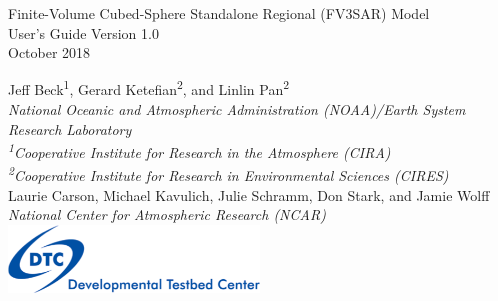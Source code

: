 \begin{titlepage}
{}
\noindent
   \begin{center}     

        \Huge{Finite-Volume Cubed-Sphere Standalone Regional (FV3SAR) Model}\\[1em]       
     {\color{darkcerulean}
        \Huge{User's Guide Version 1.0 }\\[1em]       
        \normalsize{October 2018}\\[5em] 
       }
 
      \normalsize{Jeff Beck\textsuperscript{1}, Gerard Ketefian\textsuperscript{2}, and Linlin Pan\textsuperscript{2}}\\ 
      \textit{\small{National Oceanic and Atmospheric Administration (NOAA)/Earth System Research Laboratory}}\\
      \textit{\small{\textsuperscript{1}Cooperative Institute for Research in the Atmosphere (CIRA)}}\\
      \textit{\small{\textsuperscript{2}Cooperative Institute for Research in Environmental Sciences (CIRES)}}\\[2em]
      \normalsize{Laurie Carson, Michael Kavulich, Julie Schramm, Don Stark, and Jamie Wolff}\\
      \textit{\small{National Center for Atmospheric Research (NCAR)}}\\[4em]
    
       \includegraphics[width=0.5\textwidth]{images/DTClogo.png}\\
         
      \vspace{1em}

   \end{center}
   \restoregeometry
\end{titlepage}
\pagebreak{}




